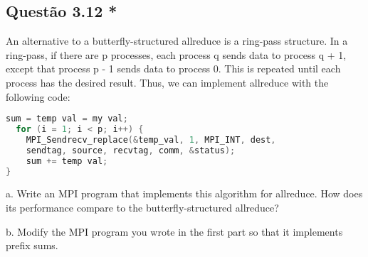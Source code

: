 

\subsection{Questão 3.12 *}

An alternative to a butterfly-structured allreduce is a ring-pass structure. In a ring-pass, if there are p processes, each process q sends data to process q + 1, except that process p - 1 sends data to process 0. This is repeated until each process has the desired result. Thus, we can implement allreduce with the following code:

\begin{lstlisting}[language=C]
sum = temp val = my val;
  for (i = 1; i < p; i++) {
    MPI_Sendrecv_replace(&temp_val, 1, MPI_INT, dest,
    sendtag, source, recvtag, comm, &status);
    sum += temp val;
}
\end{lstlisting}


a. Write an MPI program that implements this algorithm for allreduce. How does its performance compare to the butterfly-structured allreduce?

b. Modify the MPI program you wrote in the first part so that it implements prefix sums.
